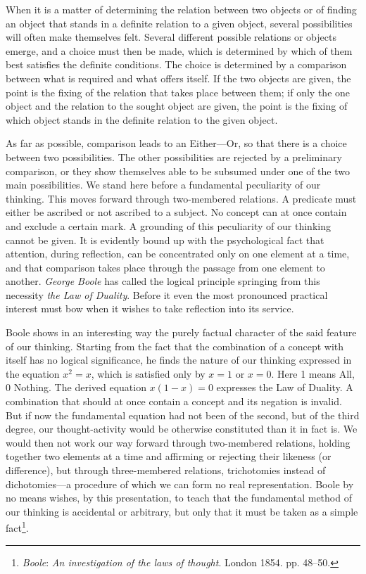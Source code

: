 \documentclass[12pt,a4paper]{book}
\newcommand{\opage}[1]{\marginnote{\footnotesize\textit{[#1]}}}
\begin{document}
When it is a matter of determining the relation between two objects or of
finding an object that stands in a definite relation to a given object,
several possibilities will often make themselves felt. Several different
possible relations or objects emerge, and a choice must then be made,
which is determined by which of them best satisfies the definite
conditions. The choice is determined by a comparison between what is
required and what offers itself. If the two objects are given, the point
is the fixing of the relation that takes place between them; if only the
one object and the relation to the sought object are given, the point is
the fixing of which object stands in the definite relation to the given
object.

As far as possible, comparison leads to an Either---Or, so that there is a
choice between two possibilities. The other possibilities are rejected by a
preliminary comparison, or they show themselves able to be subsumed under
one of the two main possibilities. We stand here before a fundamental
peculiarity of our thinking. This moves forward through two-membered
relations. A predicate must either be ascribed or not ascribed to a
subject. No concept can at once contain and exclude a certain mark. A
grounding of this \opage{68}peculiarity of our thinking cannot be given. It is
evidently bound up with the psychological fact that attention, during
reflection, can be concentrated only on one element at a time, and that
comparison takes place through the passage from one element to another.
\emph{George Boole} has called the logical principle springing from this
necessity \emph{the Law of Duality}. Before it even the most pronounced
practical interest must bow when it wishes to take reflection into its
service.

Boole shows in an interesting way the purely factual character of the said
feature of our thinking. Starting from the fact that the combination of a
concept with itself has no logical significance, he finds the nature of our
thinking expressed in the equation $x^2 = x$, which is satisfied only by
$x = 1$ or $x = 0$. Here 1 means All, 0 Nothing. The derived equation
$x(1-x) = 0$ expresses the Law of Duality. A combination that should at
once contain a concept and its negation is invalid. But if now the
fundamental equation had not been of the second, but of the third degree,
our thought-activity would be otherwise constituted than it in fact is. We
would then not work our way forward through two-membered relations,
holding together two elements at a time and affirming or rejecting their
likeness (or difference), but through three-membered relations,
trichotomies instead of dichotomies---a procedure of which we can form no
real representation. Boole by no means wishes, by this presentation, to
teach that the fundamental method of our thinking is accidental or
arbitrary, but only that it must be taken as a simple
fact\footnote{\emph{Boole}: \emph{An investigation of the laws of
thought}. London 1854. pp. 48--50.}.
\end{document}
